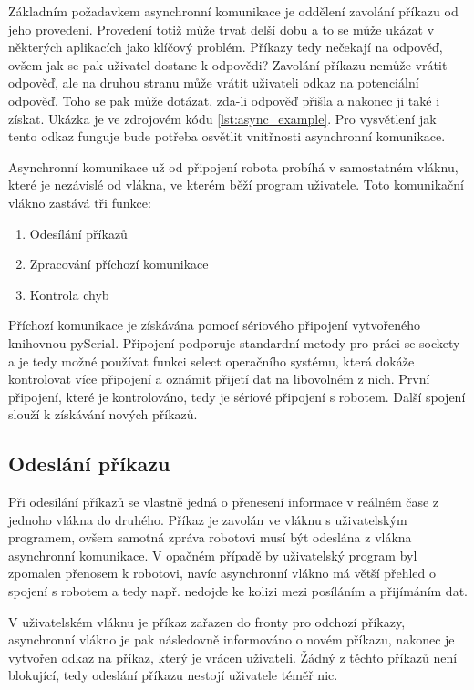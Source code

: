 \documentclass[12pt,notitlepage]{report}
\begin{document}
    Základním požadavkem asynchronní komunikace je oddělení zavolání příkazu od
    jeho provedení. Provedení totiž může trvat delší dobu a to se může ukázat v
    některých aplikacích jako klíčový problém. Příkazy tedy nečekají na
    odpověď, ovšem jak se pak uživatel dostane k odpovědi? Zavolání příkazu
    nemůže vrátit odpověď, ale na druhou stranu může vrátit uživateli odkaz na
    potenciální odpověď. Toho se pak může dotázat, zda-li odpověď přišla a
    nakonec ji také i získat. Ukázka je ve zdrojovém kódu
    \ref{lst:async_example}. Pro vysvětlení jak tento odkaz funguje bude
    potřeba osvětlit vnitřnosti asynchronní komunikace.

    Asynchronní komunikace už od připojení robota probíhá v samostatném vláknu,
    které je nezávislé od vlákna, ve kterém běží program uživatele. Toto
    komunikační vlákno zastává tři funkce:

    \begin{enumerate}
        \item Odesílání příkazů
        \item Zpracování příchozí komunikace
        \item Kontrola chyb
    \end{enumerate}

    Příchozí komunikace je získávána pomocí sériového připojení vytvořeného
    knihovnou pySerial. Připojení podporuje standardní metody pro práci se
    sockety a je tedy možné používat funkci select operačního systému, která
    dokáže kontrolovat více připojení a oznámit přijetí dat na libovolném z
    nich. První připojení, které je kontrolováno, tedy je sériové připojení s
    robotem. Další spojení slouží k získávání nových příkazů.

    \subsection{Odeslání příkazu}

    Při odesílání příkazů se vlastně jedná o přenesení informace v reálném čase
    z jednoho vlákna do druhého. Příkaz je zavolán ve vláknu s uživatelským
    programem, ovšem samotná zpráva robotovi musí být odeslána z vlákna
    asynchronní komunikace. V opačném případě by uživatelský program byl
    zpomalen přenosem k robotovi, navíc asynchronní vlákno má větší přehled o
    spojení s robotem a tedy např. nedojde ke kolizi mezi posíláním a
    přijímáním dat.

    V uživatelském vláknu je příkaz zařazen do fronty pro odchozí příkazy,
    asynchronní vlákno je pak následovně informováno o novém příkazu, nakonec
    je vytvořen odkaz na příkaz, který je vrácen uživateli. Žádný z těchto
    příkazů není blokující, tedy odeslání příkazu nestojí uživatele téměř nic.
\end{document}
